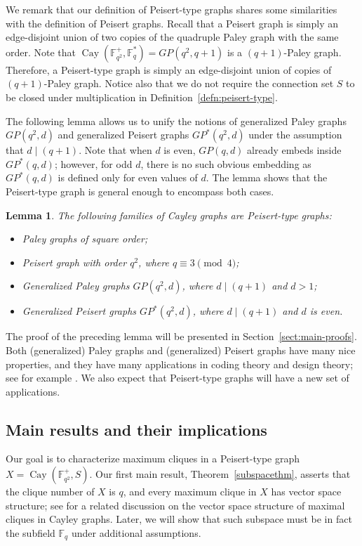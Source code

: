 \documentclass[12pt,reqno]{amsart}
\newtheorem{lem}[thm]{Lemma}
\theoremstyle{definition}
\newcommand{\F}{\mathbb{F}}
\begin{document}
We remark that our definition of Peisert-type graphs shares some similarities with the definition of Peisert graphs. Recall that a Peisert graph is simply an edge-disjoint union of two copies of the quadruple Paley graph with the same order. Note that $\operatorname{Cay}(\F_{q^2}^+, \F_q^*)=GP(q^2,q+1)$ is a $(q+1)$-Paley graph. Therefore, a Peisert-type graph is simply an edge-disjoint union of copies of $(q+1)$-Paley graph.  Notice also that we do not require the connection set $S$ to be closed under multiplication in Definition~\ref{defn:peisert-type}. 



The following lemma allows us to unify the notions of generalized Paley graphs $GP(q^2,d)$ and generalized Peisert graphs $GP^*(q^2,d)$ under the assumption that $d\mid (q+1)$. Note that when $d$ is even, $GP(q,d)$ already embeds inside $GP^{\ast}(q,d)$; however, for odd $d$, there is no such obvious embedding as $GP^{\ast}(q,d)$ is defined only for even values of $d$. The lemma shows that the Peisert-type graph is general enough to encompass both cases. 

\begin{lem} \label{Ptlem}
The following families of Cayley graphs are Peisert-type graphs:
\begin{itemize}
    \item Paley graphs of square order;
    \item Peisert graph with order $q^2$, where $q \equiv 3 \pmod 4$;
    \item Generalized Paley graphs $GP(q^2,d)$, where $d \mid (q+1)$ and $d>1$;
    \item Generalized Peisert graphs $GP^*(q^2,d)$, where $d \mid (q+1)$ and $d$ is even.
\end{itemize}
\end{lem}

The proof of the preceding lemma will be presented in Section~\ref{sect:main-proofs}. Both (generalized) Paley graphs and (generalized) Peisert graphs have many nice properties, and they have many applications in coding theory and design theory; see for example \cites{JAlex15,JL,KR,WQWX}. We also expect that Peisert-type graphs will have a new set of applications.

\subsection{Main results and their implications}\label{subsect:main-results}
Our goal is to characterize maximum cliques in a Peisert-type graph $X=\operatorname{Cay}(\F_{q^2}^+,S)$. Our first main result, Theorem~\ref{subspacethm}, asserts that the clique number of $X$ is $q$, and every maximum clique in $X$ has vector space structure; see \cite{Yip3} for a related discussion on the vector space structure of maximal cliques in Cayley graphs. Later, we will show that such subspace must be in fact the subfield $\F_q$ under additional assumptions. 
\end{document}
